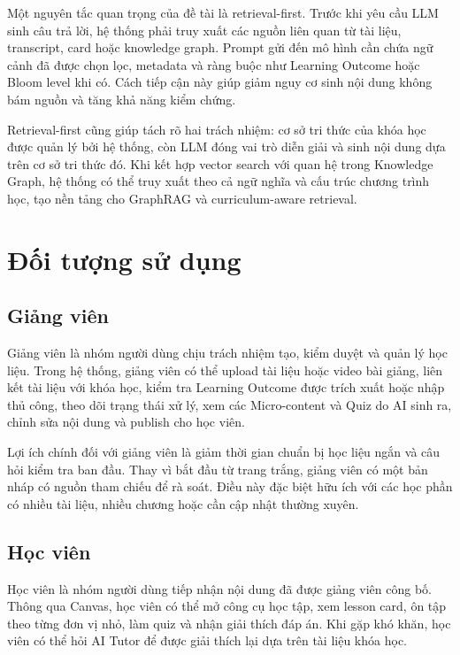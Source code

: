 Một nguyên tắc quan trọng của đề tài là retrieval-first. Trước khi yêu cầu LLM
sinh câu trả lời, hệ thống phải truy xuất các nguồn liên quan từ tài liệu,
transcript, card hoặc knowledge graph. Prompt gửi đến mô hình cần chứa ngữ
cảnh đã được chọn lọc, metadata và ràng buộc như Learning Outcome hoặc Bloom
level khi có. Cách tiếp cận này giúp giảm nguy cơ sinh nội dung không bám
nguồn và tăng khả năng kiểm chứng.

Retrieval-first cũng giúp tách rõ hai trách nhiệm: cơ sở tri thức của khóa học
được quản lý bởi hệ thống, còn LLM đóng vai trò diễn giải và sinh nội dung dựa
trên cơ sở tri thức đó. Khi kết hợp vector search với quan hệ trong Knowledge
Graph, hệ thống có thể truy xuất theo cả ngữ nghĩa và cấu trúc chương trình
học, tạo nền tảng cho GraphRAG và curriculum-aware retrieval.

\section{Đối tượng sử dụng}

\subsection{Giảng viên}

Giảng viên là nhóm người dùng chịu trách nhiệm tạo, kiểm duyệt và quản lý học
liệu. Trong hệ thống, giảng viên có thể upload tài liệu hoặc video bài giảng,
liên kết tài liệu với khóa học, kiểm tra Learning Outcome được trích xuất hoặc
nhập thủ công, theo dõi trạng thái xử lý, xem các Micro-content và Quiz do AI
sinh ra, chỉnh sửa nội dung và publish cho học viên.

Lợi ích chính đối với giảng viên là giảm thời gian chuẩn bị học liệu ngắn và
câu hỏi kiểm tra ban đầu. Thay vì bắt đầu từ trang trắng, giảng viên có một
bản nháp có nguồn tham chiếu để rà soát. Điều này đặc biệt hữu ích với các
học phần có nhiều tài liệu, nhiều chương hoặc cần cập nhật thường xuyên.

\subsection{Học viên}

Học viên là nhóm người dùng tiếp nhận nội dung đã được giảng viên công bố.
Thông qua Canvas, học viên có thể mở công cụ học tập, xem lesson card, ôn tập
theo từng đơn vị nhỏ, làm quiz và nhận giải thích đáp án. Khi gặp khó khăn,
học viên có thể hỏi AI Tutor để được giải thích lại dựa trên tài liệu khóa
học.

